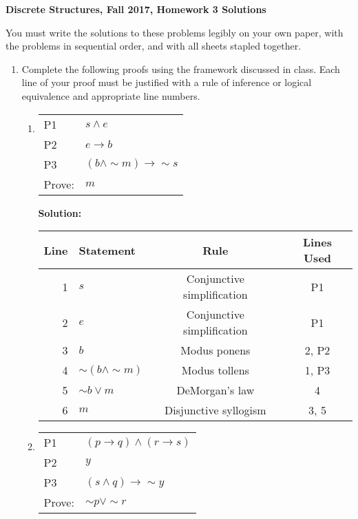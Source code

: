 \documentclass[12pt, letterpaper]{report}
\newcommand{\nott}{{\sim}}
\begin{document}
{\textbf{Discrete Structures, Fall 2017, Homework 3 Solutions}}

\medbreak

You must write the solutions to these problems legibly on your own paper, with
the problems in sequential order, and with all sheets stapled together.

\begin{enumerate}

\item Complete the following proofs using the framework discussed in class.  Each line
        of your proof must be justified with a rule of inference or logical equivalence and appropriate line numbers.

\begin{enumerate}

\item
        \begin{tabular}[t]{ll}
        P1 & $s \land e$ \\
        P2 & $e \to b$ \\
        P3 & $(b \land \nott m) \to \nott s$ \\ \hline
        Prove: & $m$
        \end{tabular}   
        
        
        \textbf{Solution:}
                
                \begin{tabular}{|r|l|c|c|} \hline
                Line & Statement & Rule & Lines Used \\ \hline
                1 & $s$ & Conjunctive simplification & P1 \\ \hline
                2 & $e$ & Conjunctive simplification & P1 \\ \hline
                3 & $b$ & Modus ponens & 2, P2 \\ \hline
                4 & $\nott (b \land \nott m)$ & Modus tollens & 1, P3 \\ \hline
                5 & $\nott b \lor m$ & DeMorgan's law & 4 \\ \hline
                6 & $m$ & Disjunctive syllogism & 3, 5 \\ \hline
                
                    \end{tabular}
        
        
        
                \item
                        \begin{tabular}[t]{ll}
                        P1 & $(p \to q) \land (r \to s)$ \\
                        P2 & $y$ \\
                        P3 & $(s \land q) \to \nott y$ \\ \hline
                        Prove: & $\nott p \lor \nott r$
                \end{tabular}
                

\end{enumerate}
\end{enumerate}
\end{document}

